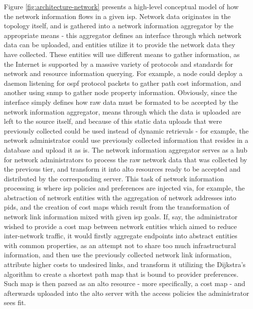     Figure \ref{fig:architecture-network} presents a high-level conceptual model of how the network information flows in a given \gls{isp}.
    Network data originates in the topology itself, and is gathered into a network information aggregator by the appropriate means - this aggregator defines an interface through which network data can be uploaded, and entities utilize it to provide the network data they have collected.
    These entities will use different means to gather information, as the Internet is supported by a massive variety of protocols and standards for network and resource information querying.
    For example, a node could deploy a daemon listening for \gls{ospf} protocol packets to gather path cost information, and another using \gls{snmp} to gather node property information.
    Obviously, since the interface simply defines how raw data must be formated to be accepted by the network information aggregator, means through which the data is uploaded are left to the source itself, and because of this static data uploads that were previously collected could be used instead of dynamic retrievals - for example, the network administrator could use previously collected information that resides in a database and upload it as is.
    The network information aggregator serves as a hub for network administrators to process the raw network data that was collected by the previous tier, and transform it into \gls{alto} resources ready to be accepted and distributed by the corresponding server.
    This task of network information processing is where \gls{isp} policies and preferences are injected via, for example, the abstraction of network entities with the aggregation of network addresses into \glspl{pid}, and the creation of cost maps which result from the transformation of network link information mixed with given \gls{isp} goals.
    If, say, the administrator wished to provide a cost map between network entities which aimed to reduce inter-network traffic, it would firstly aggregate endpoints into abstract entities with common properties, as an attempt not to share too much infrastructural information, and then use the previously collected network link information, attribute higher costs to undesired links, and transform it utilizing the Dijkstra's algorithm to create a shortest path map that is bound to provider preferences.
    Such map is then parsed as an \gls{alto} resource - more specifically, a cost map - and afterwards uploaded into the \gls{alto} server with the access policies the administrator sees fit.

